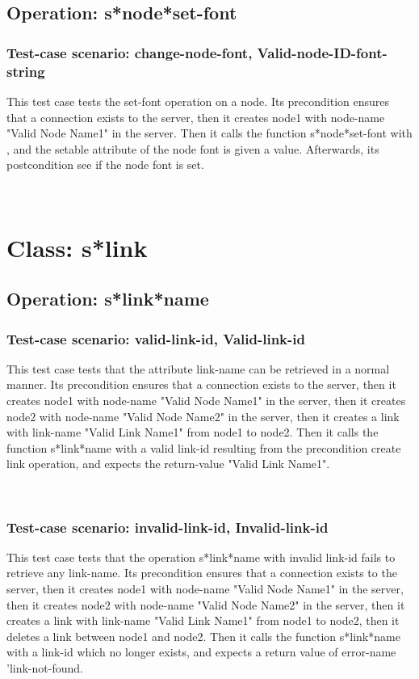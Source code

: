 \subsection {Operation: s*node*set-font}
\subsubsection {Test-case scenario: change-node-font, Valid-node-ID-font-string}


This test case tests the set-font operation on a node.
Its precondition ensures that a connection exists to the server, then it creates node1 with node-name "Valid Node Name1" in the server.
Then it calls the function s*node*set-font  with , and the setable attribute of the node font is given a value.
Afterwards, its postcondition see if the node font is set.




\
\section {Class: s*link}
\subsection {Operation: s*link*name}
\subsubsection {Test-case scenario: valid-link-id, Valid-link-id}


This test case tests that the attribute link-name can be retrieved in a normal manner.
Its precondition ensures that a connection exists to the server, then it creates node1 with node-name "Valid Node Name1" in the server, then it creates node2 with node-name  "Valid Node Name2" in the server, then it creates a link with link-name "Valid Link Name1" from node1 to node2.
Then it calls the function s*link*name  with a valid link-id resulting from the precondition create link operation, and expects the return-value "Valid Link Name1".





\
\subsubsection {Test-case scenario: invalid-link-id, Invalid-link-id}


This test case tests that the operation s*link*name with invalid link-id fails to retrieve any link-name.
Its precondition ensures that a connection exists to the server, then it creates node1 with node-name "Valid Node Name1" in the server, then it creates node2 with node-name  "Valid Node Name2" in the server, then it creates a link with link-name "Valid Link Name1" from node1 to node2, then it deletes a link between node1 and node2.
Then it calls the function s*link*name  with a link-id which no longer exists, and expects a return value of error-name 'link-not-found.





